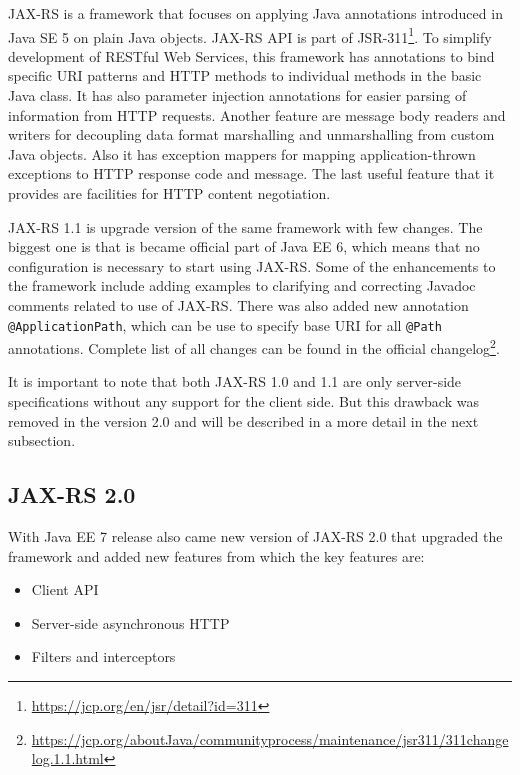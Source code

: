 \documentclass[12pt,final,oneside]{fithesis2}
\begin{document}
JAX-RS is a framework that focuses on applying Java annotations introduced in Java SE 5 on plain Java objects. JAX-RS API is part of JSR-311\footnote{\url{https://jcp.org/en/jsr/detail?id=311}}. To simplify development of RESTful Web Services, this framework has annotations to bind specific URI patterns and HTTP methods to individual methods in the basic Java class. It has also parameter injection annotations for easier parsing of information from HTTP requests. Another feature are message body readers and writers for decoupling data format marshalling and unmarshalling from custom Java objects. Also it has exception mappers for mapping application-thrown exceptions to HTTP response code and message. The last useful feature that it provides are facilities for HTTP content negotiation.\cite{resteasy-book}\cite{jax-wiki}

JAX-RS 1.1 is upgrade version of the same framework with few changes. The biggest one is that is became official part of Java EE 6, which means that no configuration is necessary to start using JAX-RS. Some of the enhancements to the framework include adding examples to clarifying and correcting Javadoc comments related to use of JAX-RS. There was also added new annotation \texttt{@ApplicationPath}, which can be use to specify base URI for all \texttt{@Path} annotations. Complete list of all changes can be found in the official changelog\footnote{\url{https://jcp.org/aboutJava/communityprocess/maintenance/jsr311/311changelog.1.1.html}}. \cite{jax-1.1}\cite{jax-1.1-2}

It is important to note that both JAX-RS 1.0 and 1.1 are only server-side specifications without any support for the client side. But this drawback was removed in the version 2.0 and will be described in a more detail in the next subsection.

\subsection{JAX-RS 2.0}\label{jax2.0}
With Java EE 7 release also came new version of JAX-RS 2.0 that upgraded the framework and added new features from which the key features are:
\begin{itemize}
\item
Client API

\item 
Server-side asynchronous HTTP

\item
Filters and interceptors
\end{itemize}
\end{document}
